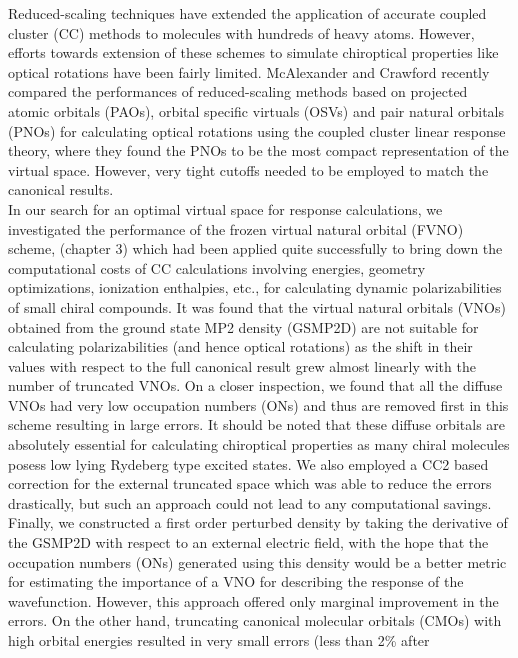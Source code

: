 Reduced-scaling techniques have extended the application of accurate coupled cluster (CC)
methods to molecules with hundreds of heavy atoms\cite{}. However, efforts towards extension 
of these schemes to simulate chiroptical properties like optical rotations have been fairly 
limited\cite{}. McAlexander and Crawford recently compared the performances of
reduced-scaling methods based on projected atomic orbitals (PAOs)\cite{}, orbital specific virtuals (OSVs)\cite{} and pair natural orbitals (PNOs)\cite{} for calculating optical rotations\cite{} using the
coupled cluster linear response theory, where they found the PNOs to be the most compact 
representation of the virtual space. However, very tight cutoffs needed to be employed to 
match the canonical results. \\
In our search for an optimal virtual space for response calculations,
we investigated the performance of the frozen virtual natural orbital (FVNO) scheme,
(chapter 3) which had been applied quite successfully to bring down the 
computational costs of CC calculations involving energies, geometry optimizations, 
ionization enthalpies, etc.\cite{}, for calculating dynamic polarizabilities of 
small chiral compounds. It was found that the virtual natural orbitals (VNOs)
obtained from the ground state MP2 density (GSMP2D) are not suitable for calculating 
polarizabilities (and hence optical rotations) as the shift in their values 
with respect to the full canonical result grew almost linearly with the number of 
truncated VNOs. On a closer inspection, we found that all the diffuse 
VNOs had very low occupation numbers (ONs) and thus are removed first
in this scheme resulting in large errors. It should be noted that these 
diffuse orbitals are absolutely essential for calculating chiroptical properties 
as many chiral molecules posess low lying Rydeberg type excited states.
We also employed a CC2\cite{} based correction for the external truncated 
space which was able to reduce the errors drastically, but such an approach 
could not lead to any computational savings. Finally, we constructed a first 
order perturbed density by taking the derivative of the GSMP2D with 
respect to an external electric field, with the hope that the occupation 
numbers (ONs) generated using this density would be a better metric for 
estimating the importance of a VNO for describing the response of the 
wavefunction. However, this approach offered only marginal improvement 
in the errors. On the other hand, truncating canonical molecular orbitals (CMOs) 
with high orbital energies resulted in very small errors (less than 2\% after 
